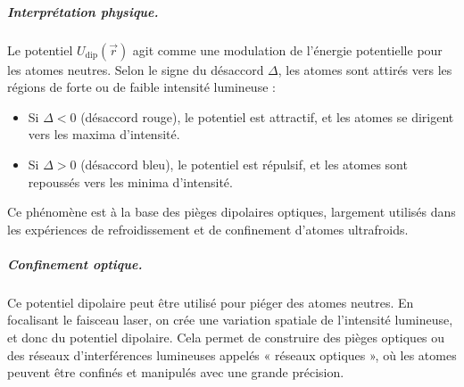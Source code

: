 

\subparagraph{Interprétation physique.}

Le potentiel \(U_{\mathrm{dip}}(\vec{r}) \) agit comme une modulation de l’énergie potentielle pour les atomes neutres. Selon le signe du désaccord \(\Delta\), les atomes sont attirés vers les régions de forte ou de faible intensité lumineuse :

\begin{itemize}
  \item Si $\Delta < 0$ (désaccord rouge), le potentiel est attractif, et les atomes se dirigent vers les maxima d’intensité.
  \item Si $\Delta > 0$ (désaccord bleu), le potentiel est répulsif, et les atomes sont repoussés vers les minima d’intensité.
\end{itemize}

Ce phénomène est à la base des pièges dipolaires optiques, largement utilisés dans les expériences de refroidissement et de confinement d’atomes ultrafroids.


\subparagraph{Confinement optique.}

Ce potentiel dipolaire peut être utilisé pour piéger des atomes neutres. En focalisant le faisceau laser, on crée une variation spatiale de l’intensité lumineuse, et donc du potentiel dipolaire. Cela permet de construire des pièges optiques ou des réseaux d’interférences lumineuses appelés « réseaux optiques », où les atomes peuvent être confinés et manipulés avec une grande précision.







